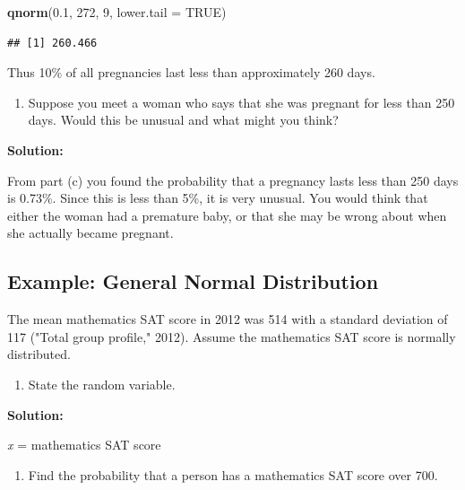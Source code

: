 \documentclass[]{book}
\newenvironment{Shaded}{\begin{snugshade}}{\end{snugshade}}
\newcommand{\DataTypeTok}[1]{\textcolor[rgb]{0.13,0.29,0.53}{#1}}
\newcommand{\DecValTok}[1]{\textcolor[rgb]{0.00,0.00,0.81}{#1}}
\newcommand{\FloatTok}[1]{\textcolor[rgb]{0.00,0.00,0.81}{#1}}
\newcommand{\KeywordTok}[1]{\textcolor[rgb]{0.13,0.29,0.53}{\textbf{#1}}}
\newcommand{\NormalTok}[1]{#1}
\newcommand{\OtherTok}[1]{\textcolor[rgb]{0.56,0.35,0.01}{#1}}
\providecommand{\tightlist}{%
  \setlength{\itemsep}{0pt}\setlength{\parskip}{0pt}}
\begin{document}
\begin{Shaded}
\begin{Highlighting}[]
\KeywordTok{qnorm}\NormalTok{(}\FloatTok{0.1}\NormalTok{, }\DecValTok{272}\NormalTok{, }\DecValTok{9}\NormalTok{, }\DataTypeTok{lower.tail =} \OtherTok{TRUE}\NormalTok{)}
\end{Highlighting}
\end{Shaded}

\begin{verbatim}
## [1] 260.466
\end{verbatim}

Thus 10\% of all pregnancies last less than approximately 260 days.

\begin{enumerate}
\def\labelenumi{\alph{enumi}.}
\setcounter{enumi}{5}
\tightlist
\item
  Suppose you meet a woman who says that she was pregnant for less
  than 250 days. Would this be unusual and what might you think?
\end{enumerate}

\textbf{Solution:}

From part (c) you found the probability that a pregnancy lasts less than 250 days is 0.73\%. Since this is less than 5\%, it is very unusual. You would think that either the woman had a premature baby, or that she may be wrong about when she actually became pregnant.

\hypertarget{example-general-normal-distribution-1}{%
\subsection{Example: General Normal Distribution}\label{example-general-normal-distribution-1}}

The mean mathematics SAT score in 2012 was 514 with a standard deviation of 117 ("Total group profile," 2012). Assume the mathematics SAT score is normally distributed.

\begin{enumerate}
\def\labelenumi{\alph{enumi}.}
\tightlist
\item
  State the random variable.
\end{enumerate}

\textbf{Solution:}

\emph{x} = mathematics SAT score

\begin{enumerate}
\def\labelenumi{\alph{enumi}.}
\setcounter{enumi}{1}
\tightlist
\item
  Find the probability that a person has a mathematics SAT score
  over 700.
\end{enumerate}
\end{document}
